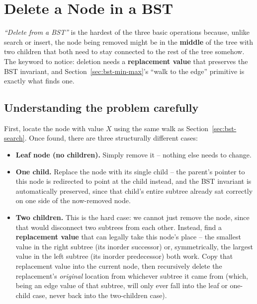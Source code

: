 \section{Delete a Node in a BST}
\label{sec:bst-delete}


\begin{patternbox}
\emph{``Delete from a BST''} is the hardest of the three basic operations
because, unlike search or insert, the node being removed might be in the
\textbf{middle} of the tree with two children that both need to stay
connected to the rest of the tree somehow. The keyword to notice: deletion
needs a \textbf{replacement value} that preserves the BST invariant, and
Section~\ref{sec:bst-min-max}'s ``walk to the edge'' primitive is exactly
what finds one.
\end{patternbox}

\subsection*{Understanding the problem carefully}

First, locate the node with value $X$ using the same walk as
Section~\ref{sec:bst-search}. Once found, there are three structurally
different cases:

\begin{itemize}
  \item \textbf{Leaf node (no children).} Simply remove it -- nothing
        else needs to change.
  \item \textbf{One child.} Replace the node with its single child --
        the parent's pointer to this node is redirected to point at the
        child instead, and the BST invariant is automatically preserved,
        since that child's entire subtree already sat correctly on one
        side of the now-removed node.
  \item \textbf{Two children.} This is the hard case: we cannot just
        remove the node, since that would disconnect two subtrees from
        each other. Instead, find a \textbf{replacement value} that can
        legally take this node's place -- the smallest value in the
        right subtree (its inorder successor) or, symmetrically, the
        largest value in the left subtree (its inorder predecessor) both
        work. Copy that replacement value into the current node, then
        recursively delete the replacement's \emph{original} location
        from whichever subtree it came from (which, being an edge value
        of that subtree, will only ever fall into the leaf or one-child
        case, never back into the two-children case).
\end{itemize}

